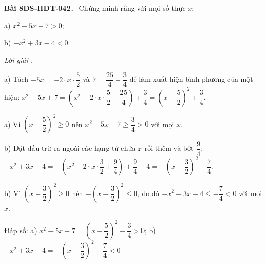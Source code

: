 \documentclass[12pt,a4paper]{article}
\newenvironment{problem}[1][]{\par\medskip\noindent\textbf{Bài #1.}\ }{\par}
\newenvironment{solution}[1][]{\par\noindent\textit{Lời giải #1.}\par}{\par}
\begin{document}
\begin{problem}[8DS-HDT-042]
Chứng minh rằng với mọi số thực $x$:

a) $x^2 - 5x + 7 > 0$;

b) $-x^2 + 3x - 4 < 0$.

\begin{solution}
a) Tách $-5x = -2 \cdot x \cdot \dfrac{5}{2}$ và $7 = \dfrac{25}{4} + \dfrac{3}{4}$ để làm xuất hiện bình phương của một hiệu: $x^2 - 5x + 7 = \left(x^2 - 2 \cdot x \cdot \dfrac{5}{2} + \dfrac{25}{4}\right) + \dfrac{3}{4} = \left(x - \dfrac{5}{2}\right)^2 + \dfrac{3}{4}$.

a) Vì $\left(x - \dfrac{5}{2}\right)^2 \geq 0$ nên $x^2 - 5x + 7 \geq \dfrac{3}{4} > 0$ với mọi $x$.

b) Đặt dấu trừ ra ngoài các hạng tử chứa $x$ rồi thêm và bớt $\dfrac{9}{4}$: $-x^2 + 3x - 4 = -\left(x^2 - 2 \cdot x \cdot \dfrac{3}{2} + \dfrac{9}{4}\right) + \dfrac{9}{4} - 4 = -\left(x - \dfrac{3}{2}\right)^2 - \dfrac{7}{4}$.

b) Vì $\left(x - \dfrac{3}{2}\right)^2 \geq 0$ nên $-\left(x - \dfrac{3}{2}\right)^2 \leq 0$, do đó $-x^2 + 3x - 4 \leq -\dfrac{7}{4} < 0$ với mọi $x$.

Đáp số: a) $\boxed{x^2 - 5x + 7 = \left(x - \dfrac{5}{2}\right)^2 + \dfrac{3}{4} > 0}$; b) $\boxed{-x^2 + 3x - 4 = -\left(x - \dfrac{3}{2}\right)^2 - \dfrac{7}{4} < 0}$
\end{solution}
\end{problem}
\end{document}
